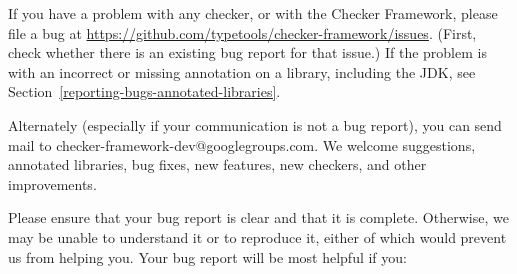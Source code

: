 
If you have a problem with any checker, or with the Checker Framework,
please file a bug at
\url{https://github.com/typetools/checker-framework/issues}.
(First, check whether there is an existing bug report for that issue.)
If the problem is with an incorrect or missing annotation on a library,
including the JDK, see Section~\ref{reporting-bugs-annotated-libraries}.

Alternately (especially if your communication is not a bug report), you can
send mail to checker-framework-dev@googlegroups.com.
We welcome suggestions, annotated libraries, bug fixes, new
features, new checkers, and other improvements.

Please ensure that your bug report is clear and that it is complete.
Otherwise, we may be unable to understand it or to reproduce it, either of
which would prevent us from helping you.  Your bug report will be most
helpful if you:

